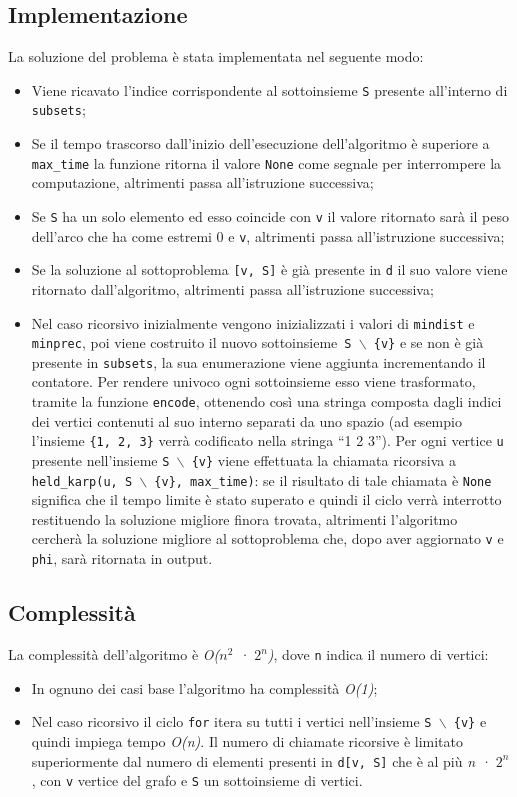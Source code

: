 \subsection{Implementazione}
La soluzione del problema è stata implementata nel seguente modo:
\begin{itemize}
	\item Viene ricavato l'indice corrispondente al sottoinsieme \texttt{S} presente all'interno di \texttt{subsets};
	\item Se il tempo trascorso dall'inizio dell'esecuzione dell'algoritmo è superiore a \texttt{max\_time} la funzione ritorna il valore \texttt{None} come segnale per interrompere la computazione, altrimenti passa all'istruzione successiva;
	\item Se \texttt{S} ha un solo elemento ed esso coincide con \texttt{v} il valore ritornato sarà il peso dell'arco che ha come estremi 0 e \texttt{v}, altrimenti passa all'istruzione successiva;
	\item Se la soluzione al sottoproblema \texttt{[v, S]} è già presente in \texttt{d} il suo valore viene ritornato dall'algoritmo, altrimenti passa all'istruzione successiva;
	\item Nel caso ricorsivo inizialmente vengono inizializzati i valori di \texttt{mindist} e \texttt{minprec}, poi viene costruito il nuovo sottoinsieme~\texttt{S $\backslash$ \{v\}} e se non è già presente in \texttt{subsets}, la sua enumerazione viene aggiunta incrementando il contatore. Per rendere univoco ogni sottoinsieme esso viene trasformato, tramite la funzione \texttt{encode}, ottenendo così una stringa composta dagli indici dei vertici contenuti al suo interno separati da uno spazio (ad esempio l'insieme \texttt{\{1, 2, 3\}} verrà codificato nella stringa ``1 2 3''). Per ogni vertice \texttt{u} presente nell'insieme \texttt{S $\backslash$ \{v\}} viene effettuata la chiamata ricorsiva a \texttt{held\_karp(u, \texttt{S $\backslash$ \{v\}}, max\_time)}: se il risultato di tale chiamata è \texttt{None} significa che il tempo limite è stato superato e quindi il ciclo verrà interrotto restituendo la soluzione migliore finora trovata, altrimenti l'algoritmo cercherà la soluzione migliore al sottoproblema che, dopo aver aggiornato \texttt{v} e \texttt{phi}, sarà ritornata in output.
\end{itemize}


\subsection{Complessità}
La complessità dell'algoritmo è \emph{O($n^2$ · $2^n$)}, dove \texttt{n} indica il numero di vertici:
\begin{itemize}
	\item In ognuno dei casi base l'algoritmo ha complessità \emph{O(1)};
	\item Nel caso ricorsivo il ciclo \texttt{for} itera su tutti i vertici nell'insieme \texttt{S $\backslash$ \{v\}} e quindi impiega tempo \emph{O(n)}. Il numero di chiamate ricorsive è limitato superiormente dal numero di elementi presenti in \texttt{d[v, S]} che è al più \emph{n · $2^n$}, con \texttt{v} vertice del grafo e \texttt{S} un sottoinsieme di vertici. 
\end{itemize}
\pagebreak